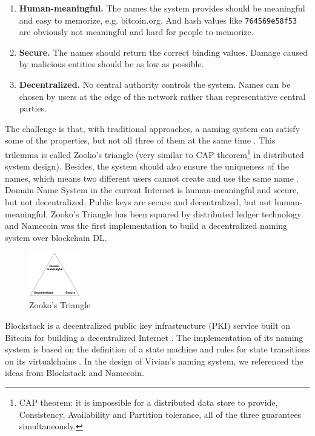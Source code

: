 \begin{enumerate}
    \item \textbf{Human-meaningful.} The names the system provides should be meaningful and easy to memorize, e.g. bitcoin.org. And hash values like \texttt{764569e58f53} are obviously not meaningful and hard for people to memorize.
    \item \textbf{Secure.} The names should return the correct binding values. Damage caused by malicious entities should be as low  as possible.
    \item \textbf{Decentralized.} No central authority controls the system. Names can be chosen by users at the edge of the network rather than representative central parties.
\end{enumerate}

The challenge is that, with traditional approaches, a naming system can satisfy some of the properties, but not all three of them at the same time \cite{wilcox2001names}. This trilemma is called Zooko's triangle \cite{swartz_2011} (very similar to CAP theorem\footnote{CAP theorem: it is impossible for a distributed data store to provide, Consistency, Availability and Partition tolerance, all of the three guarantees simultaneously.} in distributed system design).
Besides, the system should also ensure the uniqueness of the names, which means two different users cannot create and use the same name \cite{ali2017blockstack}.
Domain Name System in the current Internet is human-meaningful and secure, but not decentralized. Public keys are secure and decentralized, but not human-meaningful.
Zooko's Triangle has been squared by distributed ledger technology \cite{swartz_2011} and Namecoin was the first implementation to build a decentralized naming system over blockchain DL.

\begin{figure}[h]
    \centering
    \includegraphics[width=0.2\textwidth,trim={0 0 0 0},clip]{figs/zooko_triangle.png}
    \caption{Zooko's Triangle}
    \label{fig:zooko_triangle}
\end{figure}

Blockstack is a decentralized public key infrastructure (PKI) service built on Bitcoin for building a decentralized Internet \cite{ali2017blockstack}.
The implementation of its naming system is based on the definition of a state machine and rules for state transitions on its virtualchains \cite{nelson2016extending, ali2016blockstack}.
In the design of Vivian's naming system, we referenced the ideas from Blockstack and Namecoin.

